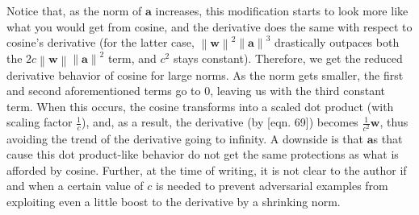 Notice that, as the norm of $\mathbf{a}$ increases, this modification starts to look more like what
you would get from cosine, and the derivative does the same with respect to cosine's derivative (for
the latter case, $\left\| \mathbf{w} \right\|^2 \left\| \mathbf{a} \right\|^3$ drastically outpaces
both the $2c \left\| \mathbf{w} \right\| \left\| \mathbf{a} \right\|^2$ term, and $c^2$ stays
constant). Therefore, we get the reduced derivative behavior of cosine for large norms. As
the norm gets smaller, the first and second aforementioned terms go to $0$, leaving us with the
third constant term. When this occurs, the cosine transforms into a scaled dot product (with scaling
factor $\frac{1}{c}$), and, as a result, the derivative (by \cite{IMM2012-03274}[eqn. 69]) becomes
$\frac{1}{c^2} \mathbf{w}$, thus avoiding the trend of the derivative going to infinity. A downside
is that $\mathbf{a}$s that cause this dot product-like behavior do not get the same protections as
what is afforded by cosine. Further, at the time of writing, it is not clear to the author if and
when a certain value of $c$ is needed to prevent adversarial examples from exploiting even a little
boost to the derivative by a shrinking norm.
